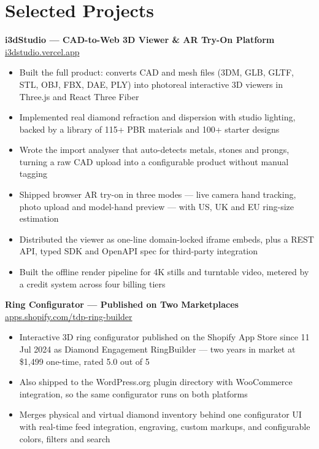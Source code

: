 \documentclass[10pt]{article}
\begin{document}
\section*{Selected Projects}

\textbf{i3dStudio --- CAD-to-Web 3D Viewer \& AR Try-On Platform} \hfill \href{https://i3dstudio.vercel.app}{i3dstudio.vercel.app}
\begin{itemize}
  \item Built the full product: converts CAD and mesh files (3DM, GLB, GLTF, STL, OBJ, FBX, DAE, PLY) into photoreal interactive 3D viewers in Three.js and React Three Fiber
  \item Implemented real diamond refraction and dispersion with studio lighting, backed by a library of 115+ PBR materials and 100+ starter designs
  \item Wrote the import analyser that auto-detects metals, stones and prongs, turning a raw CAD upload into a configurable product without manual tagging
  \item Shipped browser AR try-on in three modes --- live camera hand tracking, photo upload and model-hand preview --- with US, UK and EU ring-size estimation
  \item Distributed the viewer as one-line domain-locked iframe embeds, plus a REST API, typed SDK and OpenAPI spec for third-party integration
  \item Built the offline render pipeline for 4K stills and turntable video, metered by a credit system across four billing tiers
\end{itemize}

\vspace{1pt}

\textbf{Ring Configurator --- Published on Two Marketplaces} \hfill \href{https://apps.shopify.com/tdp-ring-builder}{apps.shopify.com/tdp-ring-builder}
\begin{itemize}
  \item Interactive 3D ring configurator published on the Shopify App Store since 11 Jul 2024 as Diamond Engagement RingBuilder --- two years in market at \$1{,}499 one-time, rated 5.0 out of 5
  \item Also shipped to the WordPress.org plugin directory with WooCommerce integration, so the same configurator runs on both platforms
  \item Merges physical and virtual diamond inventory behind one configurator UI with real-time feed integration, engraving, custom markups, and configurable colors, filters and search
\end{itemize}
\end{document}
